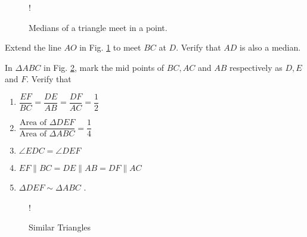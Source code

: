 \documentclass[journal,12pt,twocolumn]{IEEEtran}
\begin{document}
%
\begin{figure}[!h]
\centering
\resizebox {\columnwidth} {!} {

}
\caption{Medians of a triangle meet in a point.}
\label{fig:median}
\end{figure}
%
\begin{problem}
Extend the line $AO$ in Fig. \ref{fig:median} to meet $BC$ at $D$.  Verify that $AD$ is also a median.
\end{problem}
%
%
\begin{problem}
In $ \Delta ABC$ in Fig. \ref{fig:similar}, mark the mid points of $BC, AC$ and $AB$ respectively as $D,E$ and $F$. 
Verify that
\medskip
\begin{enumerate}
\item
$
\dfrac{EF}{BC} = \dfrac{DE}{AB} = \dfrac{DF}{AC} = \dfrac{1}{2}
$
\medskip
\item 
$
\dfrac{\text{Area of } \Delta DEF}{\text{Area of } \Delta ABC} = \dfrac{1}{4}
$
\medskip
\item 
$
\angle EDC = \angle DEF
$
\medskip
\item
$
{EF}\parallel{BC} = {DE}\parallel{AB} = {DF}\parallel{AC} 
$
\medskip
\item $\Delta DEF \sim \Delta ABC$ .
\end{enumerate}

\end{problem}
%
\begin{figure}[!h]
\centering
\resizebox {\columnwidth} {!} {

}
\caption{Similar Triangles}
\label{fig:similar}
\end{figure}
\end{document}
